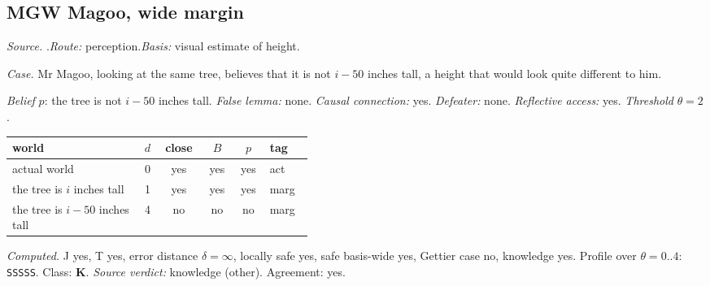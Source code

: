 \subsection*{MGW \enspace Magoo, wide margin}
\noindent\textit{Source.} \citet{Williamson2000}.\quad \textit{Route:} perception.\quad \textit{Basis:} visual estimate of height.\par
\noindent\textit{Case.} Mr Magoo, looking at the same tree, believes that it is not $i-50$ inches tall, a height that would look quite different to him.\par
\noindent\textit{Belief} $p$: the tree is not $i-50$ inches tall.
 \textit{False lemma:} none. \textit{Causal connection:} yes. \textit{Defeater:} none. \textit{Reflective access:} yes. \textit{Threshold} $\theta = 2$.\par
\begin{center}\begin{tabular}{@{}p{0.43\linewidth}rcccl@{}}
world & $d$ & close & $B$ & $p$ & tag \\ \midrule
actual world & 0 & yes & yes & yes & act \\
the tree is $i$ inches tall & 1 & yes & yes & yes & marg \\
the tree is $i-50$ inches tall & 4 & no & no & no & marg \\
\end{tabular}\end{center}
\noindent\textit{Computed.} J yes, T yes, error distance $\delta = \infty$, locally safe yes, safe basis-wide yes, Gettier case no, knowledge yes. Profile over $\theta = 0..4$: \texttt{SSSSS}. Class: \textbf{K}.
 \textit{Source verdict:} knowledge (other). Agreement: yes.
\par\medskip
{}
